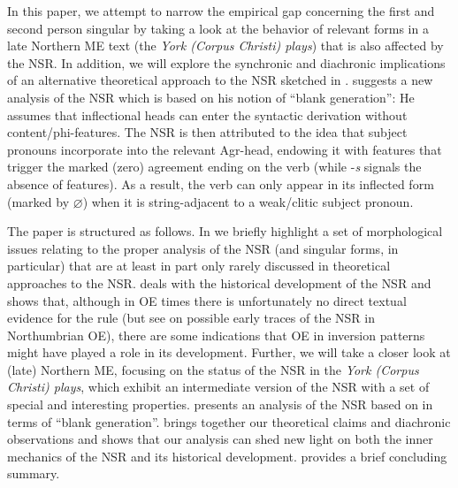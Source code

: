 \documentclass[output=paper]{langsci/langscibook}
\begin{document}
In this paper, we attempt to narrow the empirical gap concerning the first and
second person singular by taking a look at the behavior of relevant forms in a
late Northern \gls{ME} text (the \emph{York (Corpus Christi)
plays}) that is also affected by the \gls{NSR}. In
addition, we will explore the synchronic and diachronic implications of an
alternative theoretical approach to the \gls{NSR} sketched in
\textcite{Roberts:2010}. \citeauthor{Roberts:2010} suggests a new analysis of
the \gls{NSR} which is based on his notion of ``blank
generation'': He assumes that inflectional heads can enter the syntactic
derivation without content/phi-features. The \gls{NSR} is then attributed to the idea that subject pronouns incorporate into the
relevant Agr-head, endowing it with features that trigger the marked (zero)
agreement ending on the verb (while -\emph{s} signals the absence of 
features). As a result, the verb can only appear in its inflected form (marked
by $\varnothing$) when it is string-adjacent to a weak/clitic subject
pronoun.

The paper is structured as follows. In  we
briefly highlight a set of morphological issues relating to the proper analysis
of the \gls{NSR} (and singular forms, in particular) that are at least in part
only rarely discussed in theoretical approaches to the \gls{NSR}.
 deals with the historical development of the \gls{NSR} and
shows that, although in \gls{OE} times there is unfortunately no direct textual
evidence for the rule (but see \citealt{Cole2014} on possible early traces of
the \gls{NSR} in Northumbrian \gls{OE}), there are some indications that
\gls{OE}  in inversion patterns might have played a role in
its development. Further, we will take a closer look at (late) Northern ME,
focusing on the status of the \gls{NSR} in the \emph{York (Corpus Christi)
plays}, which exhibit an intermediate version of the \gls{NSR} with a set of
special and interesting properties. 
presents an analysis of the \gls{NSR} based on
\textcite{Roberts:2010} \nocite{Roberts:2010} in terms of ``blank generation''.
 brings together our theoretical claims and
diachronic observations and shows that our analysis can shed new light on both
the inner mechanics of the \gls{NSR} and its
historical development.   provides a brief concluding
summary.
\end{document}
